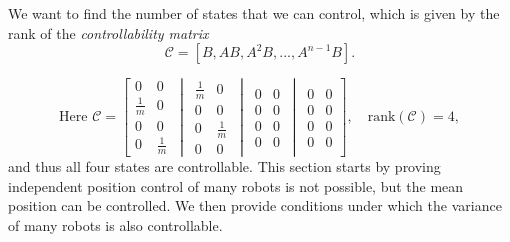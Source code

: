 We want to find the number of states that we can control, which is given by the rank of the \emph{controllability matrix}
\begin{equation}
\mathcal{C} = [ B, AB, A^2B, ... , A^{n-1}B ].
\end{equation}

\begin{equation}
\textrm{Here }
\mathcal{C}=\left[
\begin{matrix} 
0 & 0\\
\frac{1}{m} & 0 \\
0 & 0 \\
0 & \frac{1}{m}
\end{matrix}
\,\middle\vert\,
\begin{matrix} 
\frac{1}{m}& 0\\
0 & 0\\
0 & \frac{1}{m}\\
0 & 0
\end{matrix}
\,\middle\vert\,
\begin{matrix} 
0 & 0\\
0 & 0 \\
0 & 0 \\
0 & 0
\end{matrix}
\,\middle\vert\,
\begin{matrix} 
0 & 0\\
0 & 0\\
0 & 0\\
0 & 0
\end{matrix}
 \right],
 \quad \textrm{rank}(\mathcal{C})=4,
\end{equation}
and thus all four states are controllable. This section starts by proving independent position control of many robots is not possible, but the mean position can be controlled. We then provide conditions under which the variance of many robots is also controllable.

